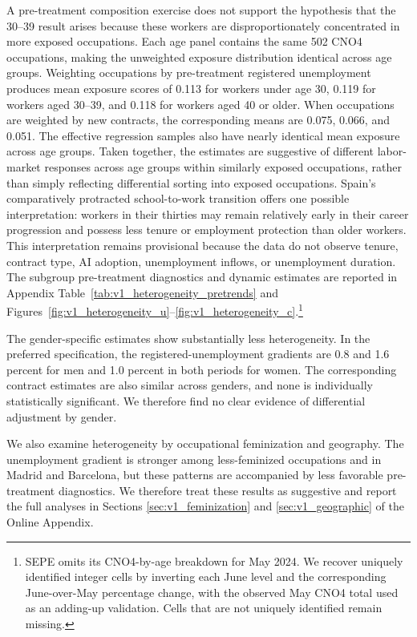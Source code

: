 A pre-treatment composition exercise does not support the hypothesis that the 30--39 result arises because these workers are disproportionately concentrated in more exposed occupations. Each age panel contains the same 502 CNO4 occupations, making the unweighted exposure distribution identical across age groups. Weighting occupations by pre-treatment registered unemployment produces mean exposure scores of 0.113 for workers under age 30, 0.119 for workers aged 30--39, and 0.118 for workers aged 40 or older. When occupations are weighted by new contracts, the corresponding means are 0.075, 0.066, and 0.051. The effective regression samples also have nearly identical mean exposure across age groups. Taken together, the estimates are suggestive of different labor-market responses across age groups within similarly exposed occupations, rather than simply reflecting differential sorting into exposed occupations. Spain's comparatively protracted school-to-work transition offers one possible interpretation: workers in their thirties may remain relatively early in their career progression and possess less tenure or employment protection than older workers. This interpretation remains provisional because the data do not observe tenure, contract type, AI adoption, unemployment inflows, or unemployment duration. The subgroup pre-treatment diagnostics and dynamic estimates are reported in Appendix Table~\ref{tab:v1_heterogeneity_pretrends} and Figures~\ref{fig:v1_heterogeneity_u}--\ref{fig:v1_heterogeneity_c}.\footnote{SEPE omits its CNO4-by-age breakdown for May 2024. We recover uniquely identified integer cells by inverting each June level and the corresponding June-over-May percentage change, with the observed May CNO4 total used as an adding-up validation. Cells that are not uniquely identified remain missing.} 

The gender-specific estimates show substantially less heterogeneity. In the preferred specification, the registered-unemployment gradients are 0.8 and 1.6 percent for men and 1.0 percent in both periods for women. The corresponding contract estimates are also similar across genders, and none is individually statistically significant. We therefore find no clear evidence of differential adjustment by gender.

We also examine heterogeneity by occupational feminization and geography. The unemployment gradient is stronger among less-feminized occupations and in Madrid and Barcelona, but these patterns are accompanied by less favorable pre-treatment diagnostics. We therefore treat these results as suggestive and report the full analyses in Sections \ref{sec:v1_feminization} and \ref{sec:v1_geographic} of the Online Appendix.


